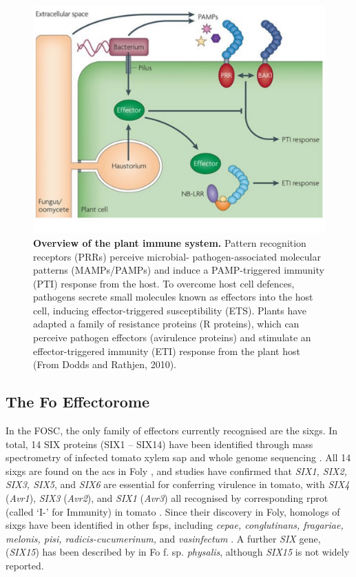 \begin{figure}[h!]
    \centering
    \includegraphics[width=\textwidth]{Figures/DoddsArticleModel.pdf}
    \caption[Overview of the plant immune system.]{\textbf{Overview of the plant immune system.} Pattern recognition receptors (PRRs) perceive microbial- pathogen-associated molecular patterns (MAMPs/PAMPs) and induce a PAMP-triggered immunity (PTI) response from the host. To overcome host cell defences, pathogens secrete small molecules known as effectors into the host cell, inducing effector-triggered susceptibility (ETS). Plants have adapted a family of resistance proteins (R proteins), which can perceive pathogen effectors (avirulence proteins) and stimulate an effector-triggered immunity (ETI) response from the plant host (From Dodds and Rathjen, 2010).}
    \label{fig:PlantImmuneSystem}
\end{figure}


\subsection{The \acl{Fo} Effectorome}
\label{Chap1:fusariumEffectorome}

In the \ac{FOSC}, the only family of effectors currently recognised are the \acp{sixg}. In total, 14 SIX proteins (SIX1 – SIX14) have been identified through mass spectrometry of infected tomato xylem sap and whole genome sequencing \parencite{Houterman2007}.  All 14 \acp{sixg} are found on the \acp{ac} in \ac{Foly} \parencite{Schmidt2013}, and studies have confirmed that \textit{SIX1, SIX2, SIX3, SIX5}, and \textit{SIX6} are essential for conferring virulence in tomato, with  \textit{SIX4} (\textit{Avr1}), \textit{SIX3} (\textit{Avr2}), and \textit{SIX1} (\textit{Avr3}) all recognised by corresponding \ac{rprot} (called ‘I-’ for Immunity) in tomato \parencite{Rep2004, Lievens2009, Takken2010, Gawehns2014, Ma2015}. Since their discovery in \ac{Foly}, homologs of \acp{sixg} have been identified in other \acp{fsp}, including \textit{cepae, conglutinans, fragariae, melonis, pisi, radicis-cucumerinum,} and \textit{vasinfectum} \parencite{Czislowski2018}. A further \textit{SIX} gene, (\textit{SIX15}) has been described by \textcite{Simbaqueba2018} in \acl{Fo} f. sp. \textit{physalis}, although \textit{SIX15} is not widely reported. 

